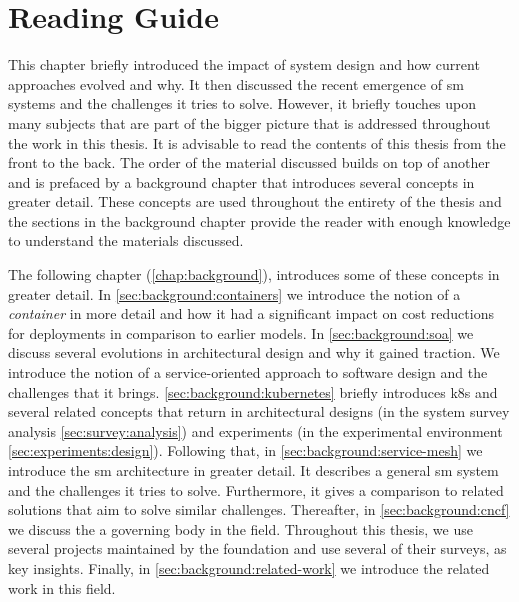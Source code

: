 \section{Reading Guide}
\label{sec:introduction:reading-guide}


This chapter briefly introduced the impact of system design and how current approaches evolved and why. It then discussed the recent emergence of \gls{sm} systems and the challenges it tries to solve. However, it briefly touches upon many subjects that are part of the bigger picture that is addressed throughout the work in this thesis. It is advisable to read the contents of this thesis from the front to the back. The order of the material discussed builds on top of another and is prefaced by a background chapter that introduces several concepts in greater detail. These concepts are used throughout the entirety of the thesis and the sections in the background chapter provide the reader with enough knowledge to understand the materials discussed.

The following chapter (\cref{chap:background}), introduces some of these concepts in greater detail. In \cref{sec:background:containers} we introduce the notion of a \textit{container} in more detail and how it had a significant impact on cost reductions for deployments in comparison to earlier models. In \cref{sec:background:soa} we discuss several evolutions in architectural design and why it gained traction. We introduce the notion of a service-oriented approach to software design and the challenges that it brings. \cref{sec:background:kubernetes} briefly introduces \gls{k8s} and several related concepts that return in architectural designs (in the system survey analysis \cref{sec:survey:analysis}) and experiments (in the experimental environment \cref{sec:experiments:design}). Following that, in \cref{sec:background:service-mesh} we introduce the \gls{sm} architecture in greater detail. It describes a general \gls{sm} system and the challenges it tries to solve. Furthermore, it gives a comparison to related solutions that aim to solve similar challenges. Thereafter, in \cref{sec:background:cncf} we discuss the  a governing body in the field. Throughout this thesis, we use several projects maintained by the foundation and use several of their surveys, as key insights. Finally, in \cref{sec:background:related-work} we introduce the related work in this field.